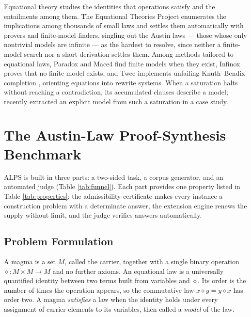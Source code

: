 \documentclass[letterpaper]{article} %
\newcommand{\op}{\diamond}
\begin{document}
Equational theory studies the identities that operations satisfy and the entailments among them. The Equational Theories Project \citep{bolan2025equational} enumerates the implications among thousands of small laws and settles them automatically with provers and finite-model finders, singling out the Austin laws \citep{kisielewicz1997austin} --- those whose only nontrivial models are infinite --- as the hardest to resolve, since neither a finite-model search nor a short derivation settles them. Among methods tailored to equational laws, Paradox and Mace4 \citep{claessen2003new, mccune2003mace4} find finite models when they exist, Infinox \citep{claessen2011automated} proves that no finite model exists, and Twee \citep{smallbone2021twee} implements unfailing Knuth--Bendix completion \citep{knuth1970simple, bachmair1989completion}, orienting equations into rewrite systems. When a saturation halts without reaching a contradiction, its accumulated clauses describe a model; \citet{janota2026case} recently extracted an explicit model from such a saturation in a case study.




\section{The Austin-Law Proof-Synthesis Benchmark}



ALPS is built in three parts: a two-sided task, a corpus generator, and an automated judge (Table \ref{tab:funnel}). Each part provides one property listed in Table \ref{tab:properties}: the admissibility certificate makes every instance a construction problem with a determinate answer, the extension engine renews the supply without limit, and the judge verifies answers automatically.



\subsection{Problem Formulation}


A magma is a set $M$, called the carrier, together with a single binary operation ${\op}\colon M \times M \to M$ and no further axioms. An equational law is a universally quantified identity between two terms built from variables and $\op$. Its order is the number of times the operation appears, so the commutative law $x \op y = y \op x$ has order two. A magma \textit{satisfies} a law when the identity holds under every assignment of carrier elements to its variables, then called a \textit{model} of the law.
\end{document}
